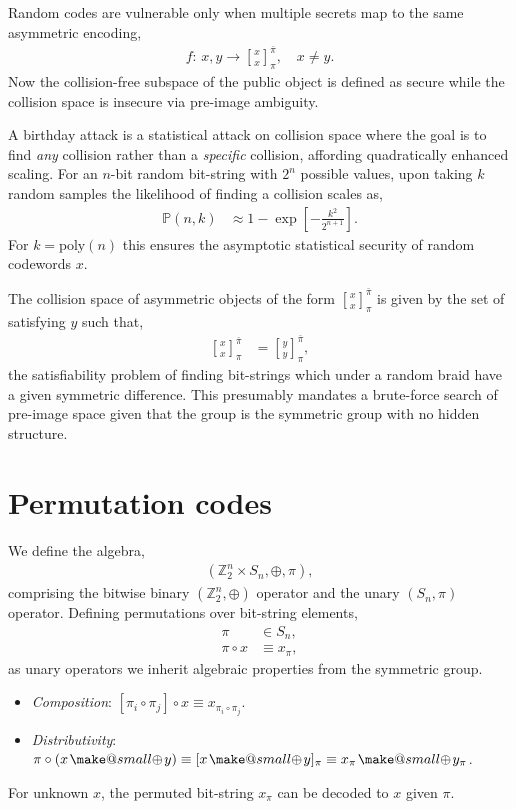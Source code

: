 \documentclass[twocolumn, aps, amsmath, amssymb, nofootinbib, superscriptaddress, longbibliography, doublefloatfix, table-of-contents, eqsecnum, rmp]{revtex4-2}
\makeatletter
\newcommand{\stackbraid}[2]{{\genfrac{[}{]}{0pt}{}{{#1}}{{#2}}}^{\bar{\pi}}_{\pi}}
\newcommand{\soplus}{{{\hspace{1pt}}{\mathbin{\mathpalette\make@small{\mathbin\oplus}}}}{\hspace{1pt}}}
\newcommand{\make@small}[2]{%
  \vcenter{\hbox{%
    \scalebox{0.6}{$\m@th#1#2$}%
  }}%
}
\makeatother
\begin{document}
Random codes are vulnerable only when multiple secrets map to the same asymmetric encoding,
\begin{align}
	f:\, x,y \to \stackbraid{x}{x},\quad x\neq y.
\end{align}
Now the collision-free subspace of the public object is defined as secure while the collision space is insecure via pre-image ambiguity.

A birthday attack is a statistical attack on collision space where the goal is to find \emph{any} collision rather than a \emph{specific} collision, affording quadratically enhanced scaling. For an $n$-bit random bit-string with $2^n$ possible values, upon taking $k$ random samples the likelihood of finding a collision scales as,
\begin{align}
	\mathbb{P}(n,k) &\approx 1 - \exp\left[-\frac{k^2}{2^{n+1}}\right].
\end{align}
For $k=\mathrm{poly}(n)$ this ensures the asymptotic statistical security of random codewords $x$.

The collision space of asymmetric objects of the form $\stackbraid{x}{x}$ is given by the set of satisfying $y$ such that,
\begin{align}
	\stackbraid{x}{x} &= \stackbraid{y}{y},
\end{align}
the satisfiability problem of finding bit-strings which under a random braid have a given symmetric difference. This presumably mandates a brute-force search of pre-image space given that the group is the symmetric group with no hidden structure.


\section{Permutation codes}

We define the algebra,
\begin{align}
	(\mathbb{Z}_2^n \times S_n, \oplus,\pi),
\end{align}
comprising the bitwise binary $(\mathbb{Z}_2^n,\oplus)$ operator and the unary $(S_n,\pi)$ operator. Defining permutations over bit-string elements,
\begin{align}
	\pi &\in S_n,\nonumber\\
	\pi\circ x &\equiv x_\pi,
\end{align}
as unary operators we inherit algebraic properties from the symmetric group.
\begin{itemize}
	\item \emph{Composition}: $[\pi_i \circ \pi_j]\circ x \equiv x_{\pi_i\circ \pi_j}$.
	\item \emph{Distributivity}: $\pi\circ(x\soplus y) \equiv [x\soplus y]_\pi \equiv x_\pi \soplus y_\pi$.
\end{itemize}
For unknown $x$, the permuted bit-string $x_\pi$ can be decoded to $x$ given $\pi$.
\end{document}
